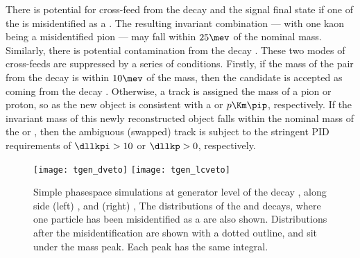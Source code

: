 




There is potential for cross-feed from the decay \decay{\Dp}{\Km\pip\pip} and
the signal \Ds final state if one of the  is misidentified as a \Kp.
The resulting invariant \kkpi combination --- with one kaon being a misidentified pion --- may fall
within $25\mev$ of the nominal \Ds mass.
Similarly, there is potential contamination from the decay .
These two modes of cross-feeds are suppressed by a series of conditions.
Firstly, if the mass of the \kk pair from the \Ds decay is within $10\mev$ of the \phii mass, then
the candidate is accepted as coming from the decay \decay{\Ds}{\kkpi}.
Otherwise, a track is assigned the mass of a pion or proton, so as the new object is consistent
with a \kkpi or $p\Km\pip$, respectively.
If the invariant mass of this newly reconstructed object falls within the nominal mass of the \Dp
or \Lc, then the ambiguous (swapped) track is subject to the stringent PID requirements of
$\dllkpi>10$ or $\dllkp>0$, respectively.



\begin{figure}
  \begin{center}
    \texttt{[image: tgen\_dveto]}
    \texttt{[image: tgen\_lcveto]}
    \caption{\small
      Simple phasespace simulations at generator level of the decay \decay{\Ds}{\kkpi}, along side
      (left) \decay{\Dp}{\kpipiss}, and
      (right) \decay{\Lc}{\pkpi},
      The distributions of the \Dp and \Lc decays, where one particle has been misidentified as a
      \Kp are also shown.
      Distributions after the misidentification are shown with a dotted outline, and sit under the
      \Ds mass peak.
      Each peak has the same integral.
    }
    \label{}
  \end{center}
\end{figure}




